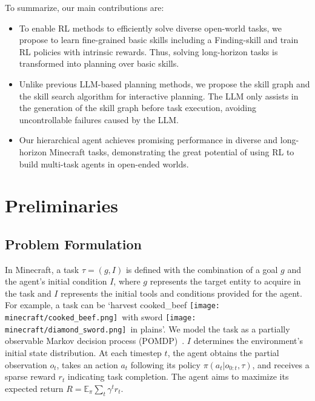 \documentclass{article}
\newcommand{\mccookedbeef}{\texttt{[image: minecraft/cooked\_beef.png]}}
\newcommand{\mcdiamondsword}{\texttt{[image: minecraft/diamond\_sword.png]}}
\begin{document}
To summarize, our main contributions are:
\begin{itemize}
    \item To enable RL methods to efficiently solve diverse open-world tasks, we propose to learn fine-grained basic skills including a Finding-skill and train RL policies with intrinsic rewards. Thus, solving long-horizon tasks is transformed into planning over basic skills.
    \item Unlike previous LLM-based planning methods, we propose the skill graph and the skill search algorithm for interactive planning. The LLM only assists in the generation of the skill graph before task execution, avoiding uncontrollable failures caused by the LLM.  %
    \item Our hierarchical agent achieves promising performance in diverse and long-horizon Minecraft tasks, demonstrating the great potential of using RL to build multi-task agents in open-ended worlds.
\end{itemize}




\section{Preliminaries}

\subsection{Problem Formulation}
In Minecraft, a task $\tau=(g,I)$ is defined with the combination of a goal $g$ and the agent's initial condition $I$, where $g$ represents the target entity to acquire in the task and $I$ represents the initial tools and conditions provided for the agent. For example, a task can be `harvest cooked\_beef \mccookedbeef \ with sword \mcdiamondsword \ in plains'. We model the task as a partially observable Markov decision process (POMDP)~\citep{pomdp}. $I$ determines the environment's initial state distribution. At each timestep $t$, the agent obtains the partial observation $o_t$, takes an action $a_t$ following its policy $\pi(a_t|o_{0:t}, \tau)$, and receives a sparse reward $r_t$ indicating task completion. The agent aims to maximize its expected return $R=\mathbb{E}_\pi \sum_t \gamma^tr_t$.
\end{document}
